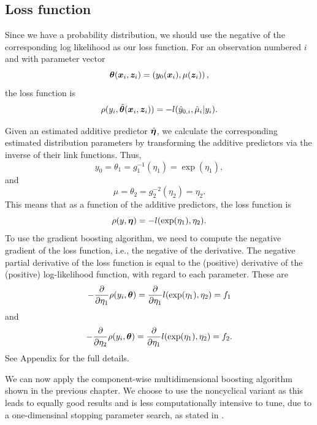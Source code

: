 \subsection{Loss function}
Since we have a probability distribution, we should use the negative of the corresponding log likelihood as our loss function.
For an observation numbered $i$ and with parameter vector
\begin{equation*}
    \boldsymbol{\theta}(\bm{x}_i,\bm{z}_i)=\left(y_0(\bm{x}_i),\mu(\bm{z}_i)\right),
\end{equation*}
the loss function is
\begin{equation*}
    \rho(y_i,\hat{\boldsymbol{\theta}}(\bm{x}_i,\bm{z}_i))=-l(\hat{y}_{0,i},\hat{\mu}_i|y_i).
\end{equation*}

Given an estimated additive predictor $\hat{\boldsymbol{\eta}}$, we calculate the corresponding estimated distribution parameters by transforming the additive predictors via the inverse of their link functions.
Thus,
\begin{equation}
    y_0=\theta_1=g_1^{-1}(\eta_1)=\exp(\eta_1),
\end{equation}
and
\begin{equation}
    \mu=\theta_2=g_2^{-2}(\eta_2)=\eta_2.
\end{equation}
This means that as a function of the additive predictors, the loss function is
\begin{equation*}
    \rho(y,\boldsymbol{\eta})=-l(\exp(\eta_1), \eta_2).
\end{equation*}
To use the gradient boosting algorithm, we need to compute the negative gradient of the loss function, i.e., the negative of the derivative. 
The negative partial derivative of the loss function is equal to the (positive) derivative of the (positive) log-likelihood function, with regard to each parameter.
These are
\begin{equation}
    -\frac{\partial}{\partial\eta_1}\rho(y_i,\boldsymbol{\theta})=\frac{\partial}{\partial\eta_1}l(\exp(\eta_1), \eta_2)=f_1
\end{equation}
and
\begin{equation}
    -\frac{\partial}{\partial\eta_2}\rho(y_i,\boldsymbol{\theta})=\frac{\partial}{\partial\eta_1}l(\exp(\eta_1), \eta_2)=f_2.
\end{equation}
See Appendix for the full details.

We can now apply the component-wise multidimensional boosting algorithm shown in the previous chapter.
We choose to use the noncyclical variant as this leads to equally good results and is less computationally intensive to tune, due to a one-dimensinal stopping parameter search, as stated in \citet{schmid}.

